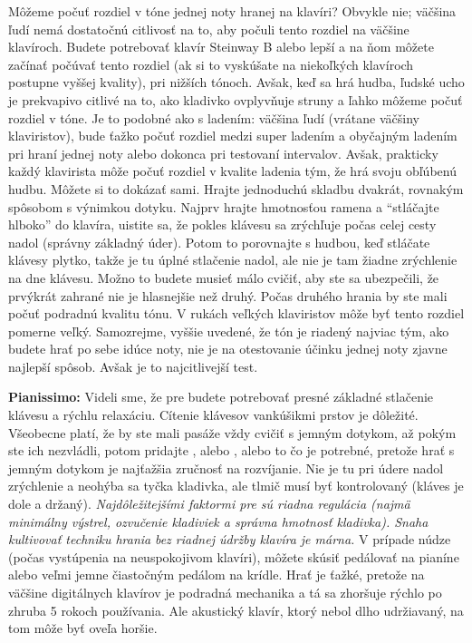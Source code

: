 Môžeme počuť rozdiel v tóne jednej noty hranej na klavíri? Obvykle nie; väčšina ľudí nemá dostatočnú citlivosť na to, aby počuli tento rozdiel na väčšine klavíroch. Budete potrebovať klavír Steinway B alebo lepší a na ňom môžete začínať počúvať tento rozdiel (ak si to vyskúšate na niekoľkých klavíroch postupne vyššej kvality), pri nižších tónoch. Avšak, keď sa hrá hudba, ľudské ucho je prekvapivo citlivé na to, ako kladivko ovplyvňuje struny a ľahko môžeme počuť rozdiel v tóne. Je to podobné ako s ladením: väčšina ľudí (vrátane väčšiny klaviristov), bude ťažko počuť rozdiel medzi super ladením a obyčajným ladením pri hraní jednej noty alebo dokonca pri testovaní intervalov. Avšak, prakticky každý klavirista môže počuť rozdiel v kvalite ladenia tým, že hrá svoju obľúbenú hudbu. Môžete si to dokázať sami. Hrajte jednoduchú skladbu dvakrát, rovnakým spôsobom s výnimkou dotyku. Najprv hrajte hmotnosťou ramena a “stláčajte hlboko” do klavíra, uistite sa, že pokles klávesu sa zrýchľuje počas celej cesty nadol (správny základný úder). Potom to porovnajte s hudbou, keď stláčate klávesy plytko, takže je tu úplné stlačenie nadol, ale nie je tam žiadne zrýchlenie na dne klávesu. Možno to budete musieť málo cvičiť, aby ste sa ubezpečili, že prvýkrát zahrané nie je hlasnejšie než druhý. Počas druhého hrania by ste mali počuť podradnú kvalitu tónu. V rukách veľkých klaviristov môže byť tento rozdiel pomerne veľký. Samozrejme, vyššie uvedené, že tón je riadený najviac tým, ako budete hrať po sebe idúce noty, nie je na otestovanie účinku jednej noty zjavne najlepší spôsob. Avšak je to najcitlivejší test.

\textbf{Pianissimo:} Videli sme, že pre  budete potrebovať presné základné stlačenie klávesu a rýchlu relaxáciu. Cítenie klávesov vankúšikmi prstov je dôležité. Všeobecne platí, že by ste mali pasáže vždy cvičiť s jemným dotykom, až pokým ste ich nezvládli, potom pridajte , alebo , alebo to čo je potrebné, pretože hrať s jemným dotykom je najťažšia zručnosť na rozvíjanie. Nie je tu pri údere nadol zrýchlenie a neohýba sa tyčka kladivka, ale tlmič musí byť kontrolovaný (kláves je dole a držaný). \emph{Najdôležitejšími faktormi pre }\emph{ sú riadna regulácia (najmä minimálny výstrel, ozvučenie kladiviek a správna hmotnosť kladivka). Snaha kultivovať techniku hrania }\emph{ bez riadnej údržby klavíra je márna.} V prípade núdze (počas vystúpenia na neuspokojivom klavíri), môžete skúsiť pedálovať na pianíne alebo veľmi jemne čiastočným pedálom na krídle. Hrať  je ťažké, pretože na väčšine digitálnych klavírov je podradná mechanika a tá sa zhoršuje rýchlo po zhruba 5 rokoch používania. Ale akustický klavír, ktorý nebol dlho udržiavaný, na tom môže byť oveľa horšie.

